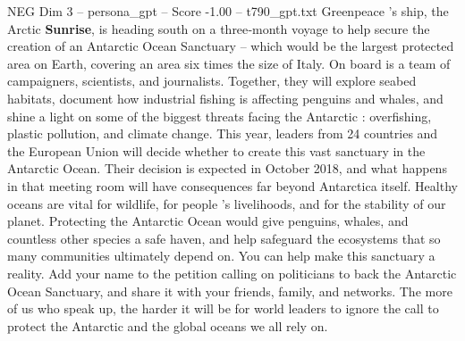 \begin{textsample}{NEG Dim 3 – persona\_gpt – Score -1.00 – t790\_gpt.txt}  \label{ex:f3_neg_033}
Greenpeace ’s ship, the Arctic \textbf{Sunrise}, is heading south on a three‑month voyage to help secure the creation of an Antarctic Ocean Sanctuary – which would be the largest protected area on Earth, covering an area six times the size of Italy.
On board is a team of campaigners, scientists, and journalists.
Together, they will explore seabed habitats, document how industrial fishing is affecting penguins and whales, and shine a light on some of the biggest threats facing the Antarctic : overfishing, plastic pollution, and climate change.
This year, leaders from 24 countries and the European Union will decide whether to create this vast sanctuary in the Antarctic Ocean.
Their decision is expected in October 2018, and what happens in that meeting room will have consequences far beyond Antarctica itself.
Healthy oceans are vital for wildlife, for people ’s livelihoods, and for the stability of our planet.
Protecting the Antarctic Ocean would give penguins, whales, and countless other species a safe haven, and help safeguard the ecosystems that so many communities ultimately depend on.
You can help make this sanctuary a reality.
Add your name to the petition calling on politicians to back the Antarctic Ocean Sanctuary, and share it with your friends, family, and networks.
The more of us who speak up, the harder it will be for world leaders to ignore the call to protect the Antarctic and the global oceans we all rely on.

\end{textsample}
